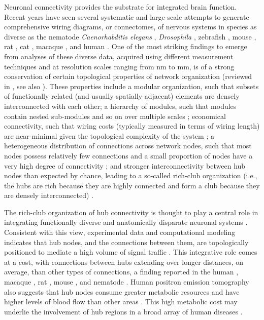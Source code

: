 \documentclass[10pt,letterpaper]{article}
\begin{document}
Neuronal connectivity provides the substrate for integrated brain function.
Recent years have seen several systematic and large-scale attempts to generate comprehensive wiring diagrams, or connectomes, of nervous systems \cite{vandenHeuvel:2016eg} in species as diverse as the nematode \emph{Caenorhabditis elegans} \cite{White:1986tx, Varshney2011}, \emph{Drosophila} \cite{Chiang:2011, Shih2015}, zebrafish \cite{Wanner:2016ea, Hildebrand:2017iu}, mouse \cite{Oh2014, Zingg:2014el}, rat \cite{bota2015}, cat \cite{scannell1995}, macaque \cite{Markov:2012wu, stephan2001}, and human \cite{Hagmann:2008gda, VanEssen2013}.
One of the most striking findings to emerge from analyses of these diverse data, acquired using different measurement techniques and at resolution scales ranging from nm to mm, is of a strong conservation of certain topological properties of network organization (reviewed in \cite{Bullmore:2009iv, Bullmore:2012vl, Sporns2011, vandenHeuvel:2016eg, Schroter:2017eo}, see also \cite{fornito2016book}).
These properties include a modular organization, such that subsets of functionally related (and usually spatially adjacent) elements are densely interconnected with each other;
a hierarchy of modules, such that modules contain nested sub-modules and so on over multiple scales \cite{Meunier:2010hq, Bassett2010};
economical connectivity, such that wiring costs (typically measured in terms of wiring length) are near-minimal given the topological complexity of the system \cite{Betzel:2016jt, Bassett2010};
a heterogeneous distribution of connections across network nodes, such that most nodes possess relatively few connections and a small proportion of nodes have a very high degree of connectivity \cite{vandenHeuvel:2013ge, Varshney2011};
and stronger interconnectivity between hub nodes than expected by chance, leading to a so-called rich-club organization (i.e., the hubs are rich because they are highly connected and form a club because they are densely interconnected) \cite{vandenHeuvel:2011he, ZamoraLopez:2010hy, deReus:2013cy,Towlson2013, Shih2015}.

The rich-club organization of hub connectivity is thought to play a central role in integrating functionally diverse and anatomically disparate neuronal systems \cite{Fornito2015, vandenHeuvel:2013ij, ZamoraLopez:2010hy, Crossley2014, Crossley:2013kl}.
Consistent with this view, experimental data and computational modeling indicates that hub nodes, and the connections between them, are topologically positioned to mediate a high volume of signal traffic \cite{vandenHeuvel:2012kh, Harriger2012, Misic:2014it, Misic:2015jw}.
This integrative role comes at a cost, with connections between hubs extending over longer distances, on average, than other types of connections, a finding reported in the human \cite{vandenHeuvel:2012kh}, macaque \cite{Harriger2012}, rat \cite{VandenHeuvel2016b}, mouse \cite{Fulcher:2016ck}, and nematode \cite{Towlson2013}.
Human positron emission tomography also suggests that hub nodes consume greater metabolic resources and have higher levels of blood flow than other areas \cite{Tomasi:2013kl, Collin:2014kq, Liang2013a}.
This high metabolic cost may underlie the involvement of hub regions in a broad array of human diseases \cite{Fornito2015, Bullmore:2012vl, Crossley2014}.
\end{document}
